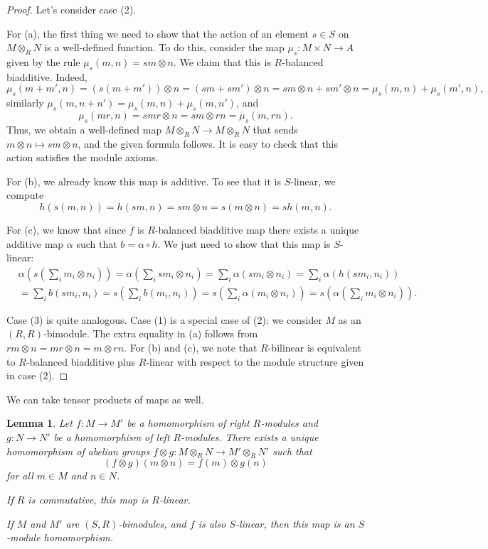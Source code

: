\documentclass{amsart}[12pt]
\numberwithin{equation}{section}
\theoremstyle{plain} %
\newtheorem{lem}[equation]{Lemma}
\theoremstyle{definition}
\theoremstyle{remark}
\begin{document}
\begin{proof} 
Let's consider case (2).

For (a), the first thing we need to show that the action of an element $s\in S$ on $M\otimes_R N$ is a well-defined function. To do this, consider the map $\mu_s: M\times N \to A$ given by the rule $\mu_s(m,n) = sm\otimes n$. We claim that this is $R$-balanced biadditive. Indeed,
\[ \mu_s(m+m',n) = (s(m+m')) \otimes n = (sm+sm') \otimes n = sm \otimes n + sm' \otimes n = \mu_s(m,n) + \mu_s(m',n),\]
similarly $\mu_s(m,n+n')=\mu_s(m,n)+\mu_s(m,n')$, and
\[ \mu_s(mr,n) = smr\otimes n = sm \otimes rn = \mu_s(m,rn).\]
Thus, we obtain a well-defined map $M\otimes_R N\to M\otimes_R N$ that sends $m\otimes n\mapsto sm \otimes n$, and the given formula follows. It is easy to check that this action satisfies the module axioms.

For (b), we already know this map is additive. To see that it is $S$-linear, we compute
\[ h(s(m,n))=h(sm,n) = sm\otimes n = s(m\otimes n) =s h(m,n).\]

For (c), we know that since $f$ is $R$-balanced biadditive map there exists a unique additive map $\alpha$ such that $b=\alpha\circ h$. We just need to show that this map is $S$-linear:
\[\begin{aligned}
 &\alpha(s(\sum_i m_i\otimes n_i )) = \alpha(\sum_i sm_i \otimes n_i) = \sum_i \alpha( sm_i \otimes n_i) = \sum_i \alpha(h(sm_i , n_i))\\ &= \sum_i b(sm_i,n_i) = s(\sum_i b(m_i,n_i))=s(\sum_i \alpha(m_i\otimes n_i)) = s(\alpha(\sum_i m_i \otimes n_i)).
 \end{aligned}\]
 
 Case (3) is quite analogous. Case (1) is a special case of (2): we consider $M$ as an $(R,R)$-bimodule. The extra equality in (a) follows from  $rm \otimes n = mr \otimes n = m \otimes rn$. For (b) and (c), we note that $R$-bilinear is equivalent to $R$-balanced biadditive plus $R$-linear with respect to the module structure given in case (2).
\end{proof}

We can take tensor products of maps as well.


\begin{lem}
	Let $f: M \to M'$ be a homomorphism of right $R$-modules and  $g: N \to N'$ be a homomorphism of left $R$-modules. There exists a unique homomorphism of abelian groups $f \otimes g : M \otimes_R N \to M' \otimes_R N'$ such that
	$$(f \otimes g)(m \otimes n) = f(m) \otimes g(n)$$
	for all $m \in M$ and $n \in N$.
	
	If $R$ is commutative, this map is $R$-linear.
	
	If $M$ and $M'$ are $(S,R)$-bimodules, and $f$ is also $S$-linear, then this map is an $S$-module homomorphism.
\end{lem}
\end{document}
